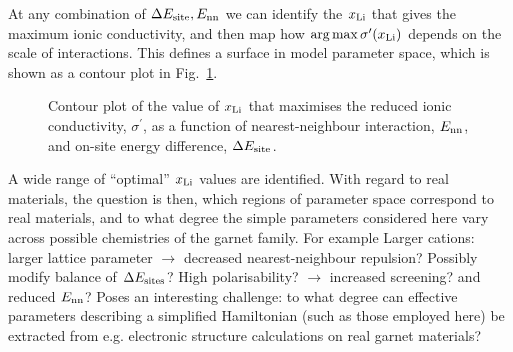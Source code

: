\documentclass[aps,prb,twocolumn,superscriptaddress,reprint]{revtex4-1}
\newcommand{\xLi}{x_\m{Li}}
\begin{document}
At any combination of $\Delta E_{\mathrm{site}}, E_{\mathrm{nn}}$ we can identify the $\xLi$ that gives the maximum ionic conductivity, and then map how $\arg\max \sigma^\prime(\xLi)$ depends on the scale of interactions. 
This defines a surface in model parameter space, which is shown as a contour plot in Fig.\ \ref{fig:max_sigma}.
\begin{figure}[tb]
  \centering
    \caption{\label{fig:max_sigma}Contour plot of the value of $\xLi$ that maximises the reduced ionic conductivity, $\sigma^\prime$, as a function of nearest-neighbour interaction, $E_{\mathrm{nn}}$, and on-site energy difference, $\Delta E_{\mathrm{site}}$.}
\end{figure}
A wide range of ``optimal'' $\xLi$ values are identified. 
With regard to real materials, the question is then, which regions of parameter space correspond to real materials, and to what degree the simple parameters considered here vary across possible chemistries  of the garnet family. 
For example  Larger cations: larger lattice parameter $\to$ decreased nearest-neighbour repulsion? Possibly modify balance of $\Delta E_{\mathrm{sites}}$? High polarisability? $\to$ increased screening? and reduced $E_{\mathrm{nn}}$? Poses an interesting challenge: to what degree can effective parameters describing a simplified Hamiltonian (such as those employed here) be extracted from e.g. electronic structure calculations on real garnet materials?
\end{document}
